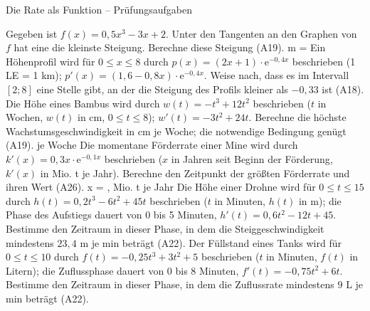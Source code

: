 \begin{aufgabe}{Die Rate als Funktion – Prüfungsaufgaben}
\begin{teile}
\teil Gegeben ist $f(x) = 0{,}5x^3 - 3x + 2$. Unter den Tangenten an den Graphen von $f$ hat eine die kleinste Steigung. Berechne diese Steigung \hfill (A19). m = \leerfeld
\teil Ein Höhenprofil wird für $0 \le x \le 8$ durch $p(x) = (2x + 1) \cdot \mathrm{e}^{-0{,}4x}$ beschrieben (1 LE = 1 km); $p'(x) = (1{,}6 - 0{,}8x) \cdot \mathrm{e}^{-0{,}4x}$. Weise nach, dass es im Intervall $[2; 8]$ eine Stelle gibt, an der die Steigung des Profils kleiner als $-0{,}33$ ist \hfill (A18).
\teil Die Höhe eines Bambus wird durch $w(t) = -t^3 + 12t^2$ beschrieben ($t$ in Wochen, $w(t)$ in cm, $0 \le t \le 8$); $w'(t) = -3t^2 + 24t$. Berechne die höchste Wachstumsgeschwindigkeit in cm je Woche; die notwendige Bedingung genügt \hfill (A19). \leerfeld[cm] je Woche
\teil Die momentane Förderrate einer Mine wird durch $k'(x) = 0{,}3x \cdot \mathrm{e}^{-0{,}1x}$ beschrieben ($x$ in Jahren seit Beginn der Förderung, $k'(x)$ in Mio. t je Jahr). Berechne den Zeitpunkt der größten Förderrate und ihren Wert \hfill (A26). x = \leerfeld , \leerfeld Mio. t je Jahr
\teil Die Höhe einer Drohne wird für $0 \le t \le 15$ durch $h(t) = 0{,}2t^3 - 6t^2 + 45t$ beschrieben ($t$ in Minuten, $h(t)$ in m); die Phase des Aufstiegs dauert von 0 bis 5 Minuten, $h'(t) = 0{,}6t^2 - 12t + 45$. Bestimme den Zeitraum in dieser Phase, in dem die Steiggeschwindigkeit mindestens $23{,}4$ m je min beträgt \hfill (A22).
\teil Der Füllstand eines Tanks wird für $0 \le t \le 10$ durch $f(t) = -0{,}25t^3 + 3t^2 + 5$ beschrieben ($t$ in Minuten, $f(t)$ in Litern); die Zuflussphase dauert von 0 bis 8 Minuten, $f'(t) = -0{,}75t^2 + 6t$. Bestimme den Zeitraum in dieser Phase, in dem die Zuflussrate mindestens $9$ L je min beträgt \hfill (A22).
\end{teile}
\end{aufgabe}

